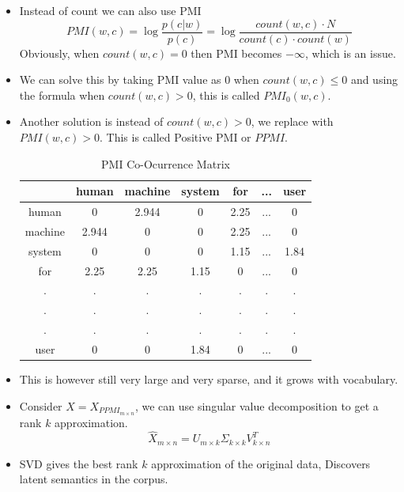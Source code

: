 \documentclass[a4paper]{article}
\begin{document}
\begin{itemize}
    \item Instead of count we can also use PMI
    \begin{equation*}
        PMI(w,c)=\log{\frac{p(c|w)}{p(c)}}=\log{\frac{count(w,c)\cdot N}{count(c)\cdot count(w)}}
    \end{equation*}
    Obviously, when $count(w,c)=0$ then PMI becomes $-\infty$, which is an issue.
    \item We can solve this by taking PMI value as $0$ when $count(w,c)\leq 0$ and using the formula when $count(w,c)> 0$, this is called $PMI_0(w,c)$.
    \item Another solution is instead of $count(w,c)>0$, we replace with $PMI(w,c)>0$. This is called Positive PMI or $PPMI$.
    \begin{table}[H]
        \centering
        \begin{tabular}{|c|c|c|c|c|c|c|}
            \hline
             & human & machine & system & for & ... & user \\
             \hline
            human & 0 & 2.944 & 0 & 2.25 & ... & 0\\
            \hline
            machine & 2.944 & 0 & 0 & 2.25 & ... & 0\\
            \hline
            system & 0 & 0 & 0 & 1.15 & ... & 1.84\\
            \hline
            for & 2.25 & 2.25 & 1.15 & 0 & ... & 0\\
            \hline
            .&.&.&.&.&.&.\\
            \hline
            .&.&.&.&.&.&.\\
            \hline
            .&.&.&.&.&.&.\\
            \hline
            user & 0 & 0 & 1.84 & 0 & ... & 0\\
            \hline
        \end{tabular}
        \caption{PMI Co-Ocurrence Matrix}
    \end{table}
    \item This is however still very large and very sparse, and it grows with vocabulary.
    \item Consider $X=X_{PPMI_{m\times n}}$, we can use singular value decomposition to get a rank $k$ approximation.
    \begin{equation*}
        \hat{X}_{m\times n}=U_{m\times k}\Sigma_{k\times k} V_{k\times n}^T
    \end{equation*}
    \item SVD gives the best rank $k$ approximation of the original data, Discovers latent semantics in the corpus.

\end{itemize}
\end{document}
